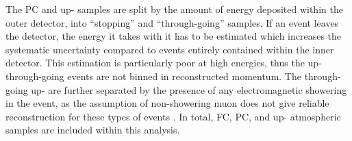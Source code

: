 The PC and up-\quickmath{\mu} samples are split by the amount of energy deposited within the outer detector, into ``stopping'' and ``through-going'' samples. If an event leaves the detector, the energy it takes with it has to be estimated which increases the systematic uncertainty compared to events entirely contained within the inner detector. This estimation is particularly poor at high energies, thus the up-\quickmath{\mu} through-going events are not binned in reconstructed momentum. The through-going up-\quickmath{\mu} are further separated by the presence of any electromagnetic showering in the event, as the assumption of non-showering muon does not give reliable reconstruction for these types of events \cite{Ashie_2005}. In total,  FC,  PC, and  up-\quickmath{\mu} atmospheric samples are included within this analysis.

